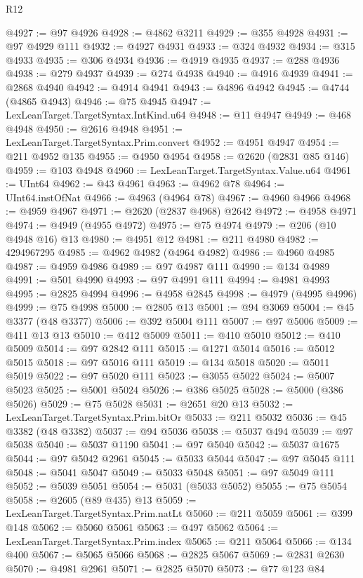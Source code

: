 \begin{lexlean}{R12}
\begin{coremodule}
{{{{{{{{{{{{{{{{{{{{{{{{{{{{{{{{{{{{{{{{{{{{{{{{{{{{{{{{{{{{{{{{{{{{{{{{{{{{{{{{{{@4927 := @97 @4926
@4928 := @4862 @3211
@4929 := @355 @4928
@4931 := @97 @4929 @111
@4932 := @4927 @4931
@4933 := @324 @4932
@4934 := @315 @4933
@4935 := @306 @4934
@4936 := @4919 @4935
@4937 := @288 @4936
@4938 := @279 @4937
@4939 := @274 @4938
@4940 := @4916 @4939
@4941 := @2868 @4940
@4942 := @4914 @4941
@4943 := @4896 @4942
@4945 := @4744 (@4865 @4943)
@4946 := @75 @4945
@4947 := LexLeanTarget.TargetSyntax.IntKind.u64
@4948 := @11 @4947
@4949 := @468 @4948
@4950 := @2616 @4948
@4951 := LexLeanTarget.TargetSyntax.Prim.convert
@4952 := @4951 @4947
@4954 := @211 @4952 @135
@4955 := @4950 @4954
@4958 := @2620 (@2831 @85 @146)
@4959 := @103 @4948
@4960 := LexLeanTarget.TargetSyntax.Value.u64
@4961 := UInt64
@4962 := @43 @4961
@4963 := @4962 @78
@4964 := UInt64.instOfNat
@4966 := @4963 (@4964 @78)
@4967 := @4960 @4966
@4968 := @4959 @4967
@4971 := @2620 (@2837 @4968) @2642
@4972 := @4958 @4971
@4974 := @4949 (@4955 @4972)
@4975 := @75 @4974
@4979 := @206 (@10 @4948 @16) @13
@4980 := @4951 @12
@4981 := @211 @4980
@4982 := 4294967295
@4985 := @4962 @4982 (@4964 @4982)
@4986 := @4960 @4985
@4987 := @4959 @4986
@4989 := @97 @4987 @111
@4990 := @134 @4989
@4991 := @501 @4990
@4993 := @97 @4991 @111
@4994 := @4981 @4993
@4995 := @2825 @4994
@4996 := @4958 @2845
@4998 := @4979 (@4995 @4996)
@4999 := @75 @4998
@5000 := @2805 @13
@5001 := @94 @3069
@5004 := @45 @3377 (@48 @3377)
@5006 := @392 @5004 @111
@5007 := @97 @5006
@5009 := @411 @13 @13
@5010 := @412 @5009
@5011 := @410 @5010
@5012 := @410 @5009
@5014 := @97 @2842 @111
@5015 := @1271 @5014
@5016 := @5012 @5015
@5018 := @97 @5016 @111
@5019 := @134 @5018
@5020 := @5011 @5019
@5022 := @97 @5020 @111
@5023 := @3055 @5022
@5024 := @5007 @5023
@5025 := @5001 @5024
@5026 := @386 @5025
@5028 := @5000 (@386 @5026)
@5029 := @75 @5028
@5031 := @2651 @20 @13
@5032 := LexLeanTarget.TargetSyntax.Prim.bitOr
@5033 := @211 @5032
@5036 := @45 @3382 (@48 @3382)
@5037 := @94 @5036
@5038 := @5037 @494
@5039 := @97 @5038
@5040 := @5037 @1190
@5041 := @97 @5040
@5042 := @5037 @1675
@5044 := @97 @5042 @2961
@5045 := @5033 @5044
@5047 := @97 @5045 @111
@5048 := @5041 @5047
@5049 := @5033 @5048
@5051 := @97 @5049 @111
@5052 := @5039 @5051
@5054 := @5031 (@5033 @5052)
@5055 := @75 @5054
@5058 := @2605 (@89 @435) @13
@5059 := LexLeanTarget.TargetSyntax.Prim.natLt
@5060 := @211 @5059
@5061 := @399 @148
@5062 := @5060 @5061
@5063 := @497 @5062
@5064 := LexLeanTarget.TargetSyntax.Prim.index
@5065 := @211 @5064
@5066 := @134 @400
@5067 := @5065 @5066
@5068 := @2825 @5067
@5069 := @2831 @2630
@5070 := @4981 @2961
@5071 := @2825 @5070
@5073 := @77 @123 @84
}}}}}}}}}}}}}}}}}}}}}}}}}}}}}}}}}}}}}}}}}}}}}}}}}}}}}}}}}}}}}}}}}}}}}}}}}}}}}}}}}}
\end{coremodule}
\end{lexlean}
